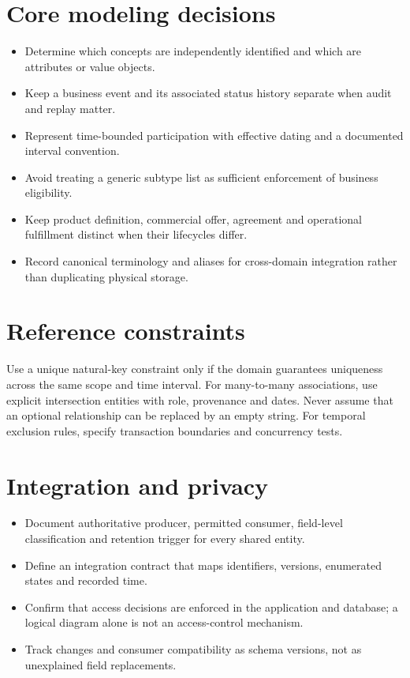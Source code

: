 \documentclass[11pt,letterpaper]{article}
\begin{document}
\section{Core modeling decisions}
\begin{itemize}
\item Determine which concepts are independently identified and which are attributes or value objects.
\item Keep a business event and its associated status history separate when audit and replay matter.
\item Represent time-bounded participation with effective dating and a documented interval convention.
\item Avoid treating a generic subtype list as sufficient enforcement of business eligibility.
\item Keep product definition, commercial offer, agreement and operational fulfillment distinct when their lifecycles differ.
\item Record canonical terminology and aliases for cross-domain integration rather than duplicating physical storage.
\end{itemize}

\section{Reference constraints}
Use a unique natural-key constraint only if the domain guarantees uniqueness across the same scope and time interval. For many-to-many associations, use explicit intersection entities with role, provenance and dates. Never assume that an optional relationship can be replaced by an empty string. For temporal exclusion rules, specify transaction boundaries and concurrency tests.


\section{Integration and privacy}
\begin{itemize}
\item Document authoritative producer, permitted consumer, field-level classification and retention trigger for every shared entity.
\item Define an integration contract that maps identifiers, versions, enumerated states and recorded time.
\item Confirm that access decisions are enforced in the application and database; a logical diagram alone is not an access-control mechanism.
\item Track changes and consumer compatibility as schema versions, not as unexplained field replacements.
\end{itemize}
\end{document}
